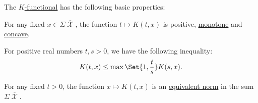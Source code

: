 \begin{proposition}\label{def:k_functional_properties}
  The \hyperref[def:k_functional]{\( K \)-functional} has the following basic properties:

  \begin{PropEnum}
     For any fixed \( x \in \Sigma \overline{\mscrX} \), the function \( t \mapsto K(t, x) \) is positive, \hyperref[def:monotone_map]{monotone} and \hyperref[def:convex_functions]{concave}.

     For positive real numbers \( t, s > 0 \), we have the following inequality:
    \begin{equation}\label{eq:def:k_functional_properties/inequality}
      K(t, x) \leq \max\Set{1, \frac t s} K(s, x).
    \end{equation}

     For any fixed \( t > 0 \), the function \( x \mapsto K(t, x) \) is an \hyperref[def:equivalent_metrics]{equivalent norm} in the sum \( \Sigma \overline{\mscrX} \).
  \end{PropEnum}
\end{proposition}
